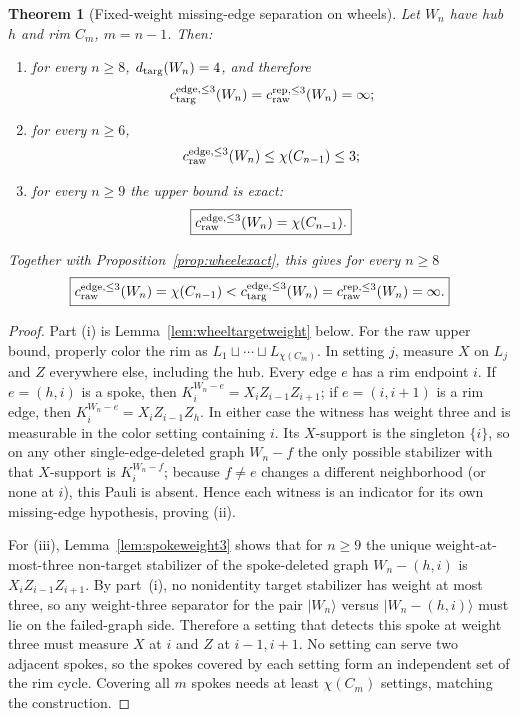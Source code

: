 \documentclass[11pt]{article}
\newtheorem{theorem}{Theorem}[section]
\theoremstyle{remark}
\begin{document}
\begin{theorem}[Fixed-weight missing-edge separation on wheels]\label{thm:wheelweightfamily}
Let $W_n$ have hub $h$ and rim $C_m$, $m=n-1$. Then:
\begin{enumerate}[label=(\roman*)]
\item for every $n\ge8$, $d_{\rm targ}(W_n)=4$, and therefore
\[
c_{\rm targ}^{\rm edge,\le3}(W_n)=c_{\rm raw}^{\rm rep,\le3}(W_n)=\infty;
\]
\item for every $n\ge6$,
\[
c_{\rm raw}^{\rm edge,\le3}(W_n)\le \chi(C_{n-1})\le3;
\]
\item for every $n\ge9$ the upper bound is exact:
\[
\boxed{c_{\rm raw}^{\rm edge,\le3}(W_n)=\chi(C_{n-1}).}
\]
\end{enumerate}
Together with Proposition~\ref{prop:wheelexact}, this gives for every $n\ge8$
\[
\boxed{
c_{\rm raw}^{\rm edge,\le3}(W_n)=\chi(C_{n-1})<
 c_{\rm targ}^{\rm edge,\le3}(W_n)=c_{\rm raw}^{\rm rep,\le3}(W_n)=\infty.}
\]
\end{theorem}
\begin{proof}
Part (i) is Lemma~\ref{lem:wheeltargetweight} below. For the raw upper bound, properly color the rim as $L_1\sqcup\cdots\sqcup L_{\chi(C_m)}$. In setting $j$, measure $X$ on $L_j$ and $Z$ everywhere else, including the hub. Every edge $e$ has a rim endpoint $i$. If $e=(h,i)$ is a spoke, then $K_i^{W_n-e}=X_iZ_{i-1}Z_{i+1}$; if $e=(i,i+1)$ is a rim edge, then $K_i^{W_n-e}=X_iZ_{i-1}Z_h$. In either case the witness has weight three and is measurable in the color setting containing $i$. Its $X$-support is the singleton $\{i\}$, so on any other single-edge-deleted graph $W_n-f$ the only possible stabilizer with that $X$-support is $K_i^{W_n-f}$; because $f\ne e$ changes a different neighborhood (or none at $i$), this Pauli is absent. Hence each witness is an indicator for its own missing-edge hypothesis, proving (ii).

For (iii), Lemma~\ref{lem:spokeweight3} shows that for $n\ge9$ the unique weight-at-most-three non-target stabilizer of the spoke-deleted graph $W_n-(h,i)$ is $X_iZ_{i-1}Z_{i+1}$. By part~(i), no nonidentity target stabilizer has weight at most three, so any weight-three separator for the pair $|W_n\rangle$ versus $|W_n-(h,i)\rangle$ must lie on the failed-graph side. Therefore a setting that detects this spoke at weight three must measure $X$ at $i$ and $Z$ at $i-1,i+1$. No setting can serve two adjacent spokes, so the spokes covered by each setting form an independent set of the rim cycle. Covering all $m$ spokes needs at least $\chi(C_m)$ settings, matching the construction.
\end{proof}
\end{document}
